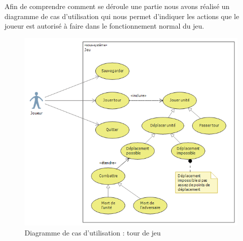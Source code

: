 Afin de comprendre comment se déroule  une partie nous avons réalisé un diagramme de cas d'utilisation qui nous permet d'indiquer les actions que le joueur est autorisé à faire dans le fonctionnement normal du jeu.
\begin{figure}[!h]
\centering
\includegraphics[width=\textwidth]{Parties/Images/cdu_TourDeJeu.png}
\caption{Diagramme de cas d'utilisation : tour de jeu}
\label{fig:cdu_TourDeJeu}
\end{figure}
